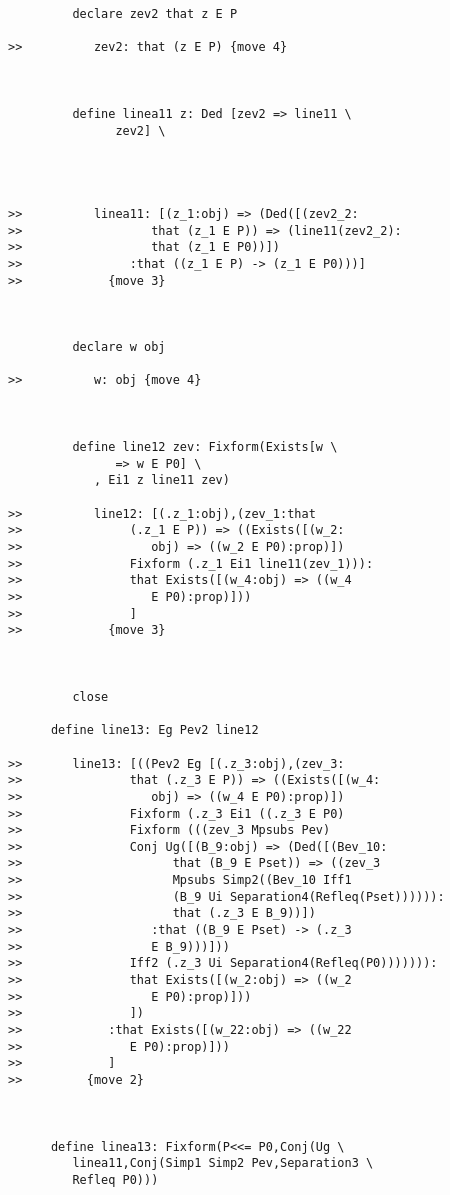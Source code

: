 \documentclass[12pt]{article}
\begin{document}
\begin{verbatim}
         declare zev2 that z E P

>>          zev2: that (z E P) {move 4}



         define linea11 z: Ded [zev2 => line11 \
               zev2] \
            



>>          linea11: [(z_1:obj) => (Ded([(zev2_2:
>>                  that (z_1 E P)) => (line11(zev2_2):
>>                  that (z_1 E P0))])
>>               :that ((z_1 E P) -> (z_1 E P0)))]
>>            {move 3}



         declare w obj

>>          w: obj {move 4}



         define line12 zev: Fixform(Exists[w \
               => w E P0] \
            , Ei1 z line11 zev)

>>          line12: [(.z_1:obj),(zev_1:that
>>               (.z_1 E P)) => ((Exists([(w_2:
>>                  obj) => ((w_2 E P0):prop)])
>>               Fixform (.z_1 Ei1 line11(zev_1))):
>>               that Exists([(w_4:obj) => ((w_4
>>                  E P0):prop)]))
>>               ]
>>            {move 3}



         close

      define line13: Eg Pev2 line12

>>       line13: [((Pev2 Eg [(.z_3:obj),(zev_3:
>>               that (.z_3 E P)) => ((Exists([(w_4:
>>                  obj) => ((w_4 E P0):prop)])
>>               Fixform (.z_3 Ei1 ((.z_3 E P0)
>>               Fixform (((zev_3 Mpsubs Pev)
>>               Conj Ug([(B_9:obj) => (Ded([(Bev_10:
>>                     that (B_9 E Pset)) => ((zev_3
>>                     Mpsubs Simp2((Bev_10 Iff1
>>                     (B_9 Ui Separation4(Refleq(Pset)))))):
>>                     that (.z_3 E B_9))])
>>                  :that ((B_9 E Pset) -> (.z_3
>>                  E B_9)))]))
>>               Iff2 (.z_3 Ui Separation4(Refleq(P0))))))):
>>               that Exists([(w_2:obj) => ((w_2
>>                  E P0):prop)]))
>>               ])
>>            :that Exists([(w_22:obj) => ((w_22
>>               E P0):prop)]))
>>            ]
>>         {move 2}



      define linea13: Fixform(P<<= P0,Conj(Ug \
         linea11,Conj(Simp1 Simp2 Pev,Separation3 \
         Refleq P0)))


\end{verbatim}
\end{document}
